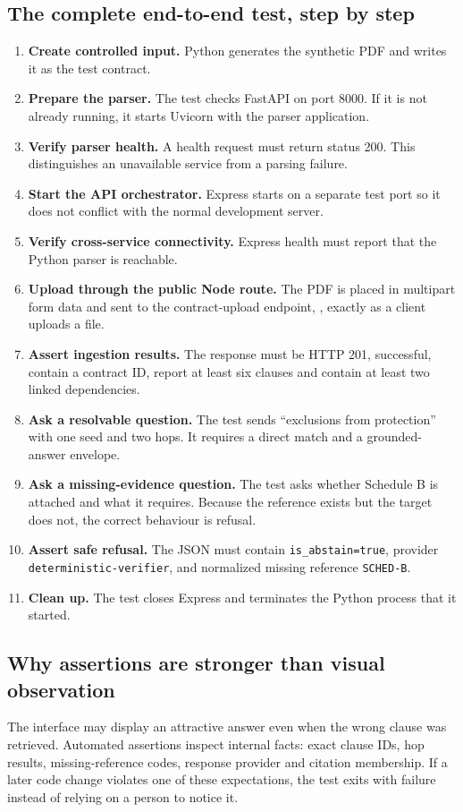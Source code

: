 \documentclass[11pt,letterpaper]{article}
\begin{document}
\newpage
\subsection{The complete end-to-end test, step by step}
\begin{enumerate}
  \item \textbf{Create controlled input.} Python generates the synthetic PDF and writes it as the test contract.
  \item \textbf{Prepare the parser.} The test checks FastAPI on port 8000. If it is not already running, it starts Uvicorn with the parser application.
  \item \textbf{Verify parser health.} A health request must return status 200. This distinguishes an unavailable service from a parsing failure.
  \item \textbf{Start the API orchestrator.} Express starts on a separate test port so it does not conflict with the normal development server.
  \item \textbf{Verify cross-service connectivity.} Express health must report that the Python parser is reachable.
  \item \textbf{Upload through the public Node route.} The PDF is placed in multipart form data and sent to the contract-upload endpoint, , exactly as a client uploads a file.
  \item \textbf{Assert ingestion results.} The response must be HTTP 201, successful, contain a contract ID, report at least six clauses and contain at least two linked dependencies.
  \item \textbf{Ask a resolvable question.} The test sends ``exclusions from protection'' with one seed and two hops. It requires a direct match and a grounded-answer envelope.
  \item \textbf{Ask a missing-evidence question.} The test asks whether Schedule B is attached and what it requires. Because the reference exists but the target does not, the correct behaviour is refusal.
  \item \textbf{Assert safe refusal.} The JSON must contain \texttt{is\_abstain=true}, provider \texttt{deterministic-verifier}, and normalized missing reference \texttt{SCHED-B}.
  \item \textbf{Clean up.} The test closes Express and terminates the Python process that it started.
\end{enumerate}

\subsection{Why assertions are stronger than visual observation}
The interface may display an attractive answer even when the wrong clause was retrieved. Automated assertions inspect internal facts: exact clause IDs, hop results, missing-reference codes, response provider and citation membership. If a later code change violates one of these expectations, the test exits with failure instead of relying on a person to notice it.
\end{document}
